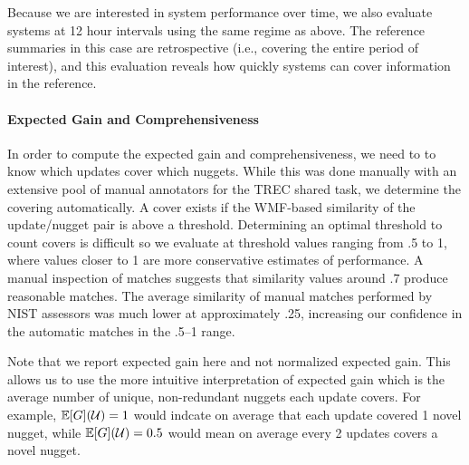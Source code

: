 Because we are interested in system performance over time, we also evaluate
systems at 12 hour intervals using the same regime as above. The reference
summaries in this case are retrospective (i.e., covering the entire period 
of interest), and this evaluation reveals how
quickly systems can cover  information in the reference.


\paragraph{Expected Gain and Comprehensiveness}

In order to compute the expected gain and comprehensiveness, we need to 
to know which updates cover which nuggets. While this was done manually with
an extensive pool of manual annotators for the TREC shared task, we determine
the covering automatically.
A cover exists if the 
WMF-based similarity of the update/nugget pair is above a threshold. 
Determining an optimal threshold to count covers is difficult so we evaluate 
at threshold values ranging from .5 to 1, where values closer to 1 are more 
conservative estimates of performance. A manual inspection of matches suggests
that similarity values around .7 produce reasonable matches.
The average similarity of manual matches performed by NIST assessors 
was much lower at approximately .25, increasing our confidence in the 
automatic matches in the .5--1 range.

Note that we report expected gain here and not normalized expected gain.
This allows us to use the more intuitive interpretation of expected gain
which is the average number of unique, non-redundant nuggets each update
covers. For example, $\mathbb{E}[G](\mathcal{U})=1$ would indcate
on average that each update covered 1 novel nugget, while $\mathbb{E}[G](\mathcal{U})=0.5$ would mean on average every 2 updates covers a novel
nugget.



